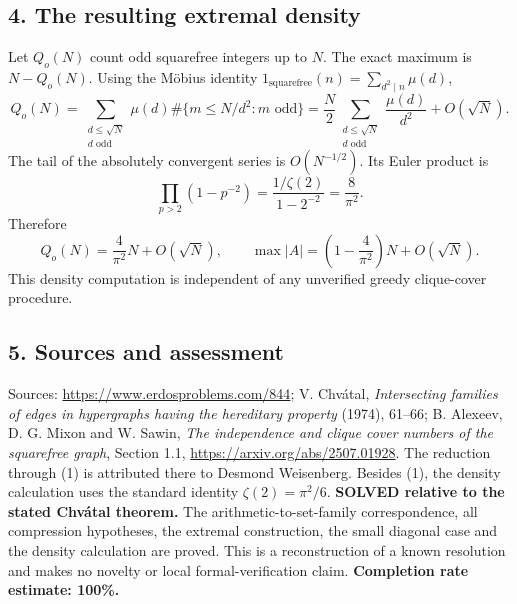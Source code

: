 \subsection*{4. The resulting extremal density}
Let $Q_o(N)$ count odd squarefree integers up to $N$. The exact maximum is $N-Q_o(N)$. Using the M\"obius identity $1_{\mathrm{squarefree}}(n)=\sum_{d^2\mid n}\mu(d)$,
\[
 Q_o(N)=\sum_{\substack{d\le\sqrt N\\d\text{ odd}}}\mu(d)
        \#\{m\le N/d^2:m\text{ odd}\}
 =\frac N2\sum_{\substack{d\le\sqrt N\\d\text{ odd}}}\frac{\mu(d)}{d^2}
   +O(\sqrt N).
\]
The tail of the absolutely convergent series is $O(N^{-1/2})$. Its Euler product is
\[
 \prod_{p>2}(1-p^{-2})=\frac{1/\zeta(2)}{1-2^{-2}}=\frac8{\pi^2}.
\]
Therefore
\[
 Q_o(N)=\frac4{\pi^2}N+O(\sqrt N),\qquad
 \max|A|=\left(1-\frac4{\pi^2}\right)N+O(\sqrt N).
\]
This density computation is independent of any unverified greedy clique-cover procedure.
\subsection*{5. Sources and assessment}
Sources: \url{https://www.erdosproblems.com/844}; V. Chv\'atal, \emph{Intersecting families of edges in hypergraphs having the hereditary property} (1974), 61--66; B. Alexeev, D. G. Mixon and W. Sawin, \emph{The independence and clique cover numbers of the squarefree graph}, Section 1.1, \url{https://arxiv.org/abs/2507.01928}. The reduction through (1) is attributed there to Desmond Weisenberg. Besides (1), the density calculation uses the standard identity $\zeta(2)=\pi^2/6$.
\textbf{SOLVED relative to the stated Chv\'atal theorem.} The arithmetic-to-set-family correspondence, all compression hypotheses, the extremal construction, the small diagonal case and the density calculation are proved. This is a reconstruction of a known resolution and makes no novelty or local formal-verification claim.
\textbf{Completion rate estimate: 100\%.}

